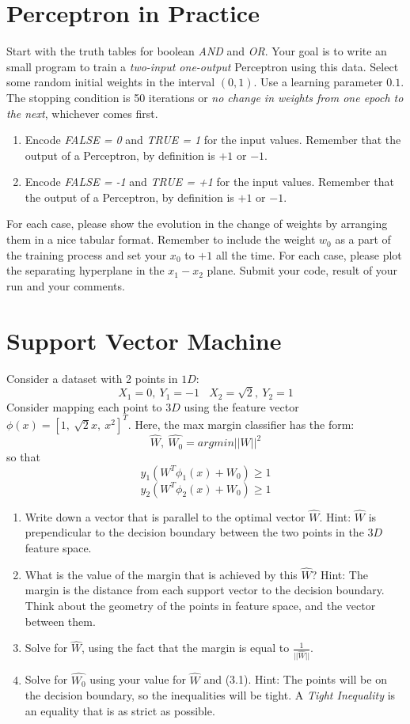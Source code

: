 \documentclass[12pt]{article}
\numberwithin{equation}{section}
\numberwithin{table}{section}
\numberwithin{figure}{section}
\begin{document}
\section{Perceptron in Practice}
Start with the truth tables for boolean \textit{AND} and \textit{OR}. Your goal is to write an small program to train a \textit{two-input one-output} Perceptron using this data. Select some random initial weights in the interval $(0, 1)$. Use a learning parameter $0.1$. The stopping condition is 50 iterations or \textit{no change in weights from one epoch to the next}, whichever comes first.
\begin{enumerate}[label=(\alph*)]
	\item Encode \textit{FALSE = 0} and \textit{TRUE = 1} for the input values. Remember that the output of a Perceptron, by definition is $+1$ or $-1$.
	\item Encode \textit{FALSE = -1} and \textit{TRUE = +1} for the input values. Remember that the output of a Perceptron, by definition is $+1$ or $-1$.
\end{enumerate}
For each case, please show the evolution in the change of weights by arranging them in a nice tabular format. Remember to include the weight $w_0$ as a part of the training process and set your $x_0$ to $+1$ all the time. For each case, please plot the separating hyperplane in the $x_1-x_2$ plane. Submit your code, result of your run and your comments.

\section{Support Vector Machine}
Consider a dataset with 2 points in $1D$:
$$
	X_1 = 0,\ Y_1 = -1 \ \ \ \ X_2 = \sqrt{2},\ Y_2 = 1
$$
Consider mapping each point to $3D$ using the feature vector $\phi(x) = [1,\ \sqrt{2}x,\  x^2]^T$. Here, the max margin classifier has the form:
\begin{equation}
	\hat{W},\ \hat{W_0} = argmin||W||^2
\end{equation}
so that
$$
	y_1(W^T\phi_1(x) + W_0) \geq 1
$$
$$
	y_2(W^T\phi_2(x) + W_0) \geq 1
$$
\begin{enumerate}[label=(\alph*)]
	\item Write down a vector that is parallel to the optimal vector $\hat{W}$. Hint: $\hat{W}$ is prependicular to the decision boundary between the two points in the $3D$ feature space.
	
	\item What is the value of the margin that is achieved by this $\hat{W}$? Hint: The margin is the distance from each support vector to the decision boundary. Think about the geometry of the points in feature space, and the vector between them.
	
	\item Solve for $\hat{W}$, using the fact that the margin is equal to $\frac{1}{||\hat{W}||}$.
	
	\item Solve for $\hat{W_0}$ using your value for $\hat{W}$ and (3.1). Hint: The points will be on the decision boundary, so the inequalities will be tight. A \textit{Tight Inequality} is an equality that is as strict as possible.
\end{enumerate}
\end{document}
